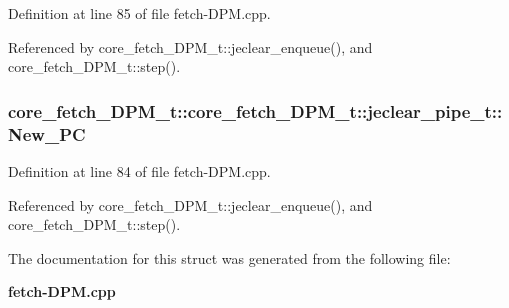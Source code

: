 Definition at line 85 of file fetch-DPM.cpp.

Referenced by core\_\-fetch\_\-DPM\_\-t::jeclear\_\-enqueue(), and core\_\-fetch\_\-DPM\_\-t::step().
\subsubsection[{New\_\-PC}]{ core\_\-fetch\_\-DPM\_\-t::core\_\-fetch\_\-DPM\_\-t::jeclear\_\-pipe\_\-t::New\_\-PC}\label{structcore__fetch__DPM__t_1_1jeclear__pipe__t_753b5046e0f85483f82885da8ca35728}




Definition at line 84 of file fetch-DPM.cpp.

Referenced by core\_\-fetch\_\-DPM\_\-t::jeclear\_\-enqueue(), and core\_\-fetch\_\-DPM\_\-t::step().

The documentation for this struct was generated from the following file:\begin{CompactItemize}
\item 
{\bf fetch-DPM.cpp}\end{CompactItemize}
